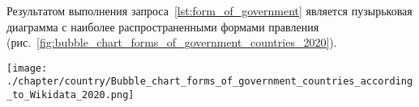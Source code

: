 Результатом выполнения запроса~\ref{lst:form_of_government} является 
пузырьковая диаграмма с наиболее распространенными формами правления 
(рис.~\ref{fig:bubble_chart_forms_of_government_countries_2020}).


\begin{figure*}
    \centering
    \texttt{[image: ./chapter/country/Bubble\_chart\_forms\_of\_government\_countries\_according\_to\_Wikidata\_2020.png]}
    \caption[Формы правления стран, 2020 год.]
    {Соотношение числа разных форм правления по~странам мира на~2020 год}
	\label{fig:bubble_chart_forms_of_government_countries_2020}%
\end{figure*} 




